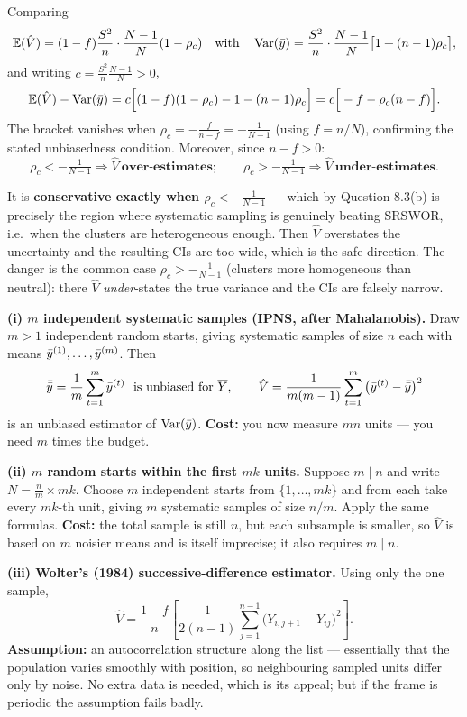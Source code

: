  Comparing
\[
  \mathbb{E}(\hat V)=(1-f)\frac{S^2}{n}\cdot\frac{N-1}{N}(1-\rho_c)
  \quad\text{with}\quad
  \operatorname{Var}(\bar{y})=\frac{S^2}{n}\cdot\frac{N-1}{N}\big[1+(n-1)\rho_c\big],
\]
and writing $c=\frac{S^2}{n}\frac{N-1}{N}>0$,
\[
  \mathbb{E}(\hat V)-\operatorname{Var}(\bar{y})=c\Big[(1-f)(1-\rho_c)-1-(n-1)\rho_c\Big]=c\Big[-f-\rho_c(n-f)\Big].
\]
The bracket vanishes when $\rho_c=-\frac{f}{n-f}=-\frac1{N-1}$ (using $f=n/N$), confirming the
stated unbiasedness condition. Moreover, since $n-f>0$:
\[
  \rho_c<-\tfrac{1}{N-1}\Rightarrow\hat V\ \textbf{over-estimates};\qquad
  \rho_c>-\tfrac{1}{N-1}\Rightarrow\hat V\ \textbf{under-estimates}.
\]

 It is \textbf{conservative exactly when $\rho_c<-\frac1{N-1}$} --- which by Question 8.3(b)
is precisely the region where systematic sampling is genuinely beating SRSWOR, i.e.\ when the
clusters are heterogeneous enough. Then $\hat V$ overstates the uncertainty and the resulting CIs
are too wide, which is the safe direction. The danger is the common case
$\rho_c>-\frac1{N-1}$ (clusters more homogeneous than neutral): there $\hat V$
\emph{under}-states the true variance and the CIs are falsely narrow.

\sol
\textbf{(i) $m$ independent systematic samples (IPNS, after Mahalanobis).} Draw $m>1$ independent
random starts, giving systematic samples of size $n$ each with means
$\bar{y}^{(1)},\dots,\bar{y}^{(m)}$. Then
\[
  \bar{\bar y}=\frac1m\sum_{t=1}^m\ybar^{(t)}\ \text{ is unbiased for }\Ybar,
  \qquad
  \hat V=\frac{1}{m(m-1)}\sum_{t=1}^m\big(\ybar^{(t)}-\bar{\bar y}\big)^2
\]
is an unbiased estimator of $\operatorname{Var}(\bar{\bar y})$. \textbf{Cost:} you now measure $mn$ units --- you
need $m$ times the budget.

\textbf{(ii) $m$ random starts within the first $mk$ units.} Suppose $m\mid n$ and write
$N=\frac nm\times mk$. Choose $m$ independent starts from $\{1,\dots,mk\}$ and from each take
every $mk$-th unit, giving $m$ systematic samples of size $n/m$. Apply the same formulas.
\textbf{Cost:} the total sample is still $n$, but each subsample is smaller, so $\hat V$ is based
on $m$ noisier means and is itself imprecise; it also requires $m\mid n$.

\textbf{(iii) Wolter's (1984) successive-difference estimator.} Using only the one sample,
\[
  \hat V=\frac{1-f}{n}\left[\frac{1}{2(n-1)}\sum_{j=1}^{n-1}\big(Y_{i,j+1}-Y_{ij}\big)^2\right].
\]
\textbf{Assumption:} an autocorrelation structure along the list --- essentially that the
population varies smoothly with position, so neighbouring sampled units differ only by noise. No
extra data is needed, which is its appeal; but if the frame is periodic the assumption fails
badly.

